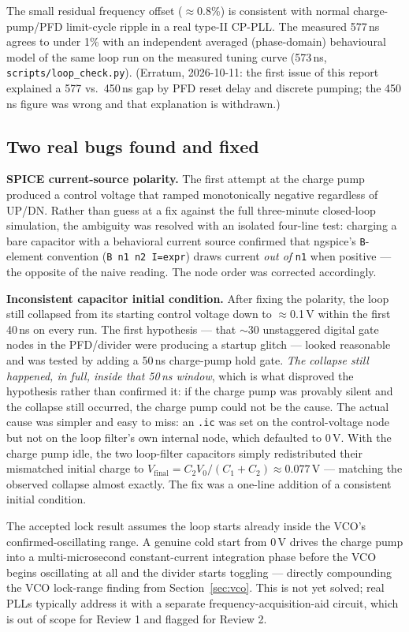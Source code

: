 \documentclass[11pt]{article}
\begin{document}
The small residual frequency offset ($\approx$0.8\%) is consistent with normal charge-pump/PFD limit-cycle ripple in a real type-II CP-PLL. The measured 577\,ns agrees to under 1\% with an independent averaged (phase-domain) behavioural model of the same loop run on the measured tuning curve (573\,ns, \texttt{scripts/loop\_check.py}). (Erratum, 2026-10-11: the first issue of this report explained a 577 vs.\ 450\,ns gap by PFD reset delay and discrete pumping; the 450\,ns figure was wrong and that explanation is withdrawn.)

\subsection{Two real bugs found and fixed}

\textbf{SPICE current-source polarity.} The first attempt at the charge pump produced a control voltage that ramped monotonically negative regardless of UP/DN. Rather than guess at a fix against the full three-minute closed-loop simulation, the ambiguity was resolved with an isolated four-line test: charging a bare capacitor with a behavioral current source confirmed that ngspice's \texttt{B}-element convention (\texttt{B n1 n2 I=expr}) draws current \emph{out of} \texttt{n1} when positive --- the opposite of the naive reading. The node order was corrected accordingly.

\textbf{Inconsistent capacitor initial condition.} After fixing the polarity, the loop still collapsed from its starting control voltage down to $\approx$0.1\,V within the first 40\,ns on every run. The first hypothesis --- that $\sim$30 unstaggered digital gate nodes in the PFD/divider were producing a startup glitch --- looked reasonable and was tested by adding a 50\,ns charge-pump hold gate. \emph{The collapse still happened, in full, inside that 50\,ns window}, which is what disproved the hypothesis rather than confirmed it: if the charge pump was provably silent and the collapse still occurred, the charge pump could not be the cause. The actual cause was simpler and easy to miss: an \texttt{.ic} was set on the control-voltage node but not on the loop filter's own internal node, which defaulted to 0\,V. With the charge pump idle, the two loop-filter capacitors simply redistributed their mismatched initial charge to $V_{\text{final}} = C_2 V_0/(C_1+C_2) \approx 0.077$\,V --- matching the observed collapse almost exactly. The fix was a one-line addition of a consistent initial condition.

\begin{risk}
The accepted lock result assumes the loop starts already inside the VCO's confirmed-oscillating range. A genuine cold start from 0\,V drives the charge pump into a multi-microsecond constant-current integration phase before the VCO begins oscillating at all and the divider starts toggling --- directly compounding the VCO lock-range finding from Section~\ref{sec:vco}. This is not yet solved; real PLLs typically address it with a separate frequency-acquisition-aid circuit, which is out of scope for Review 1 and flagged for Review 2.
\end{risk}
\end{document}
